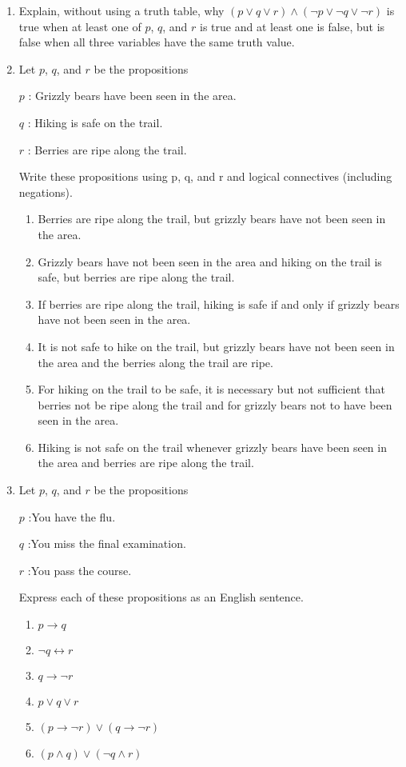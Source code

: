 \documentclass{sig-alternate-05-2015}
\begin{document}
\begin{enumerate}
\item Explain, without using a truth table, why $(p \vee q \vee r) \wedge
(\neg p \vee \neg q \vee \neg r)$ is true when at least one of $p$, $q$, and $r$
is true and at least one is false, but is false when all three
variables have the same truth value.

\item Let $p$, $q$, and $r$ be the propositions

$p$ : Grizzly bears have been seen in the area.

$q$ : Hiking is safe on the trail.

$r$ : Berries are ripe along the trail.

Write these propositions using p, q, and r and logical
connectives (including negations).
\begin{enumerate}
\item Berries are ripe along the trail, but grizzly bears have
not been seen in the area.
\item Grizzly bears have not been seen in the area and hiking
on the trail is safe, but berries are ripe along the
trail.
\item If berries are ripe along the trail, hiking is safe if and
only if grizzly bears have not been seen in the area.
\item It is not safe to hike on the trail, but grizzly bears have
not been seen in the area and the berries along the trail
are ripe.
\item For hiking on the trail to be safe, it is necessary but not
sufficient that berries not be ripe along the trail and
for grizzly bears not to have been seen in the area.
\item Hiking is not safe on the trail whenever grizzly bears
have been seen in the area and berries are ripe along
the trail.
\end{enumerate}
\item Let $p$, $q$, and $r$ be the propositions

$p$ :You have the flu.

$q$ :You miss the final examination.

$r$ :You pass the course.

Express each of these propositions as an English sentence.
\begin{enumerate}
	\item $p\rightarrow q$
	\item $\neg q \leftrightarrow r$
	\item $q \rightarrow \neg r$
	\item $p \vee q \vee r$
	\item $(p \rightarrow \neg r ) \vee (q \rightarrow \neg r)$
	\item $(p\wedge q)\vee (\neg q \wedge r)$
\end{enumerate}
\end{enumerate}
\end{document}
